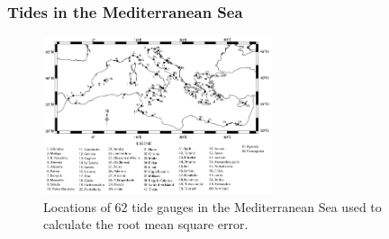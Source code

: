 %
\begin{frame}
    \frametitle{Tides in the Mediterranean Sea}
\begin{figure}
\centering
\includegraphics[width=0.6\textwidth]{./tides_in_the_Mediterranean_Sea/gauges.png}
\caption{Locations of 62 tide gauges in the Mediterranean Sea used to calculate the root mean square error.}
\end{figure}
\end{frame}


